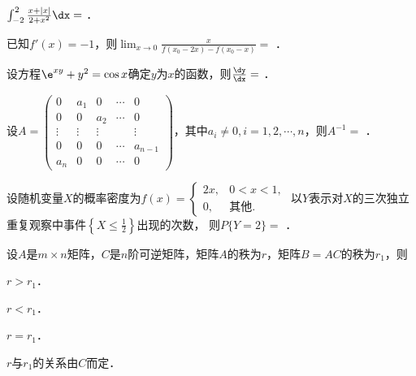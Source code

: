 \documentclass[plain,noanswer,medmath]{../../template/jnuexam}
\begin{document}






\begin{problem}
$\int_{-2}^2\frac{x + |x|}{2 + x^2} \dx =$ \fillin{}．
\end{problem}


\begin{problem}
已知$f'(x) = - 1$，则$\lim_{x \to 0} \frac{x}{f(x_0 - 2x) - f(x_0 - x)} =$ \fillin{}．
\end{problem}


\begin{problem}
设方程$\e^{xy} + y^2 = \cos x$确定$y$为$x$的函数，则$\frac{\dy}{\dx} =$ \fillin{}．
\end{problem}


\begin{problem}
设$A = \begin{pmatrix}
       0 &    a_1 &      0 & \cdots & 0 \\
       0 &      0 &    a_2 & \cdots & 0 \\
  \vdots & \vdots & \vdots &        & \vdots \\
       0 &      0 &      0 & \cdots & a_{n - 1} \\
     a_n &      0 &      0 & \cdots & 0
\end{pmatrix}$，其中$a_i \ne 0,i = 1,2, \cdots ,n$，则$A^{-1} =$ \fillin{}．
\end{problem}


\begin{problem}
设随机变量$X$的概率密度为$f(x) = \begin{cases}
  2x, & 0 < x < 1, \\
   0, & \text{其他}.
\end{cases}$
以$Y$表示对$X$的三次独立重复观察中事件$\left\{X \le \frac{1}{2} \right\}$出现的次数，
则$P\{Y = 2\} =$ \fillin{}．
\end{problem}








\begin{problem}
设$A$是$m \times n$矩阵，$C$是$n$阶可逆矩阵，矩阵$A$的秩为$r$，矩阵$B = AC$的秩为$r_1$，则\pickout{}
\begin{abcd}
\item $r > r_1$．                            
\item $r < r_1$．
\item $r = r_1$．                            
\item $r$与$r_1$的关系由$C$而定．
\end{abcd}
\end{problem}
\end{document}

